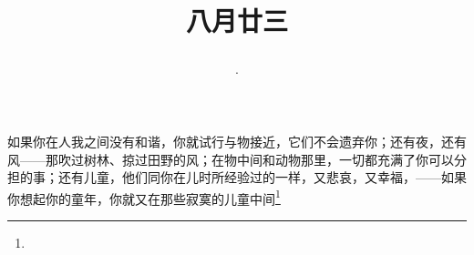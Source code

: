 \title{\date[d=25,m=9,y=2024][year:cn-y,年,month:cn,day:cn,日,·,weekday]·八月廿三 }
如果你在人我之间没有和谐，你就试行与物接近，它们不会遗弃你；还有夜，还有风——那吹过树林、掠过田野的风；在物中间和动物那里，一切都充满了你可以分担的事；还有儿童，他们同你在儿时所经验过的一样，又悲哀，又幸福，——如果你想起你的童年，你就又在那些寂寞的儿童中间\footnote{ }

